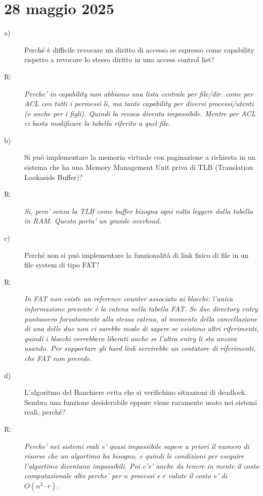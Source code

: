 \documentclass[a4paper,12pt]{article}
\newcommand{\datasection}[1]{%
    \section*{#1}%
    \addcontentsline{toc}{section}{#1}%
}
\newenvironment{exambox}{%
    \begin{mdframed}[
        linecolor=black!70,
        linewidth=0.6pt,
        innerleftmargin=8pt,
        innerrightmargin=8pt,
        innertopmargin=6pt,
        innerbottommargin=6pt
    ]
    \begin{description}
}{%
    \end{description}
    \end{mdframed}
}
\begin{document}
\newpage
\datasection{28 maggio 2025}
\begin{exambox}
\item[a)] Perché è difficile revocare un diritto di accesso se espresso come capability rispetto a revocare lo stesso diritto in una access control list?
\item[R:] \textit{Perche' in capability non abbiamo una lista centrale per file/dir. come per ACL con tutti i permessi li, ma tante capability per diversi processi/utenti (e anche per i figli). Quindi la revoca diventa impossibile. Mentre per ACL ci basta modificare la tabella riferito a quel file.}
\label{risposta:diff_acl_cap}
\item[b)] Si può implementare la memoria virtuale con paginazione a richiesta in un sistema che ha una Memory Management Unit priva di TLB (Translation Lookaside Buffer)?
\item[R:] \textit{Si, pero' senza la TLB come buffer bisogna ogni volta leggere dalla tabella in RAM. Questo porta' un grande overhead.}
\item[c)] Perché non si può implementare la funzionalità di link fisico di file in un file system di tipo FAT?
\item[R:] \textit{In FAT non esiste un reference counter associato ai blocchi: l'unica informazione presente è la catena nella tabella FAT. Se due directory entry puntassero forzatamente alla stessa catena, al momento della cancellazione di una delle due non ci sarebbe modo di sapere se esistono altri riferimenti, quindi i blocchi verrebbero liberati anche se l'altra entry li sta ancora usando. Per supportare gli hard link servirebbe un contatore di riferimenti, che FAT non prevede.}
\item[d)] L'algoritmo del Banchiere evita che si verifichino situazioni di deadlock. Sembra una funzione desiderabile eppure viene raramente usato nei sistemi reali, perché?
\item[R:] \textit{Perche' nei sistemi reali e' quasi impossibile sapere a priori il numero di risorse che un algortimo ha bisogno, e quindi le condizioni per eseguire l'algortimo diventano impossibili. Poi c'e' anche da tenere in mente il costo computazionale alto perche' per $n$ processi e $r$ valute il costo e' di $O(n^2 \cdot r)$.}
\end{exambox}
\end{document}
